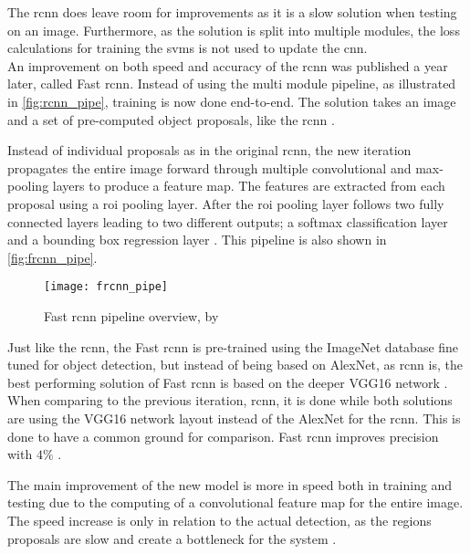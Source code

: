 The \gls{rcnn} does leave room for improvements as it is a slow solution when testing on an image. Furthermore, as the solution is split into multiple modules, the loss calculations for training the \gls{svm}s is not used to update the \gls{cnn}.\\

An improvement on both speed and accuracy of the \gls{rcnn} was published a year later, called Fast \gls{rcnn}. Instead of using the multi module pipeline, as illustrated in \autoref{fig:rcnn_pipe}, training is now done end-to-end. The solution takes an image  and a set of pre-computed object proposals, like the \gls{rcnn} \citep{Girshick2015}.

Instead of individual proposals as in the original \gls{rcnn}, the new iteration propagates the entire image forward through multiple convolutional and max-pooling layers to produce a feature map. The features are extracted from each proposal using a \gls{roi} pooling layer. After the \gls{roi} pooling layer follows two fully connected layers leading to two different outputs; a softmax classification layer and a bounding box regression layer \citep{Girshick2015}. This pipeline is also shown in \autoref{fig:frcnn_pipe}.

\begin{figure}[H]
	\centering
	\texttt{[image: frcnn\_pipe]}
	\caption{Fast \gls{rcnn} pipeline overview, by \cite{Girshick2015}}
	\label{fig:frcnn_pipe}
\end{figure}

Just like the \gls{rcnn}, the Fast \gls{rcnn} is pre-trained using the ImageNet database fine tuned for object detection, but instead of being based on AlexNet, as \gls{rcnn} is, the best performing solution of Fast \gls{rcnn} is based on the deeper VGG16 network \citep{Girshick2015}. When comparing to the previous iteration, \gls{rcnn}, it is done while both solutions are using the VGG16 network layout instead of the AlexNet for the \gls{rcnn}. This is done to have a common ground for comparison. Fast \gls{rcnn} improves precision with $4\%$ \citep{Girshick2015}.

The main improvement of the new model is more in speed both in training and testing due to the computing of a convolutional feature map for the entire image. The speed increase is only in relation to the actual detection, as the regions proposals are slow and create a bottleneck for the system \citep{Girshick2015}.\\

